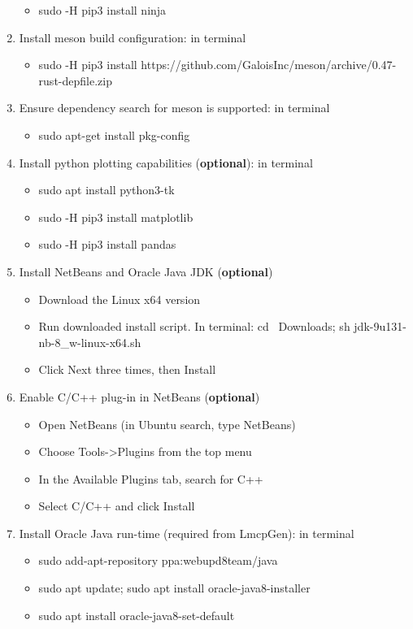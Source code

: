 \begin{enumerate}
  \begin{itemize}
  \tightlist
  \item
    sudo -H pip3 install ninja
  \end{itemize}
\item
  Install meson build configuration: in terminal

  \begin{itemize}
  \tightlist
  \item
    sudo -H pip3 install https://github.com/GaloisInc/meson/archive/0.47-rust-depfile.zip
  \end{itemize}
\item
  Ensure dependency search for meson is supported: in terminal

  \begin{itemize}
  \tightlist
  \item
    sudo apt-get install pkg-config
  \end{itemize}
\item
  Install python plotting capabilities (\textbf{optional}): in terminal

  \begin{itemize}
  \item
    sudo apt install python3-tk
  \item
    sudo -H pip3 install matplotlib
  \item
    sudo -H pip3 install pandas
  \end{itemize}
\item
  Install NetBeans and Oracle Java JDK (\textbf{optional})

  \begin{itemize}
  \item
    Download the Linux x64 version
  \item
    Run downloaded install script. In terminal: cd ~Downloads; sh
    jdk-9u131-nb-8\_w-linux-x64.sh
  \item
    Click Next three times, then Install
  \end{itemize}
\item
  Enable C/C++ plug-in in NetBeans (\textbf{optional})

  \begin{itemize}
  \item
    Open NetBeans (in Ubuntu search, type NetBeans)
  \item
    Choose Tools-\textgreater{}Plugins from the top menu
  \item
    In the Available Plugins tab, search for C++
  \item
    Select C/C++ and click Install
  \end{itemize}
\item
  Install Oracle Java run-time (required from LmcpGen): in terminal

  \begin{itemize}
  \item
    sudo add-apt-repository ppa:webupd8team/java
  \item
    sudo apt update; sudo apt install oracle-java8-installer
  \item
    sudo apt install oracle-java8-set-default
  \end{itemize}
\end{enumerate}

